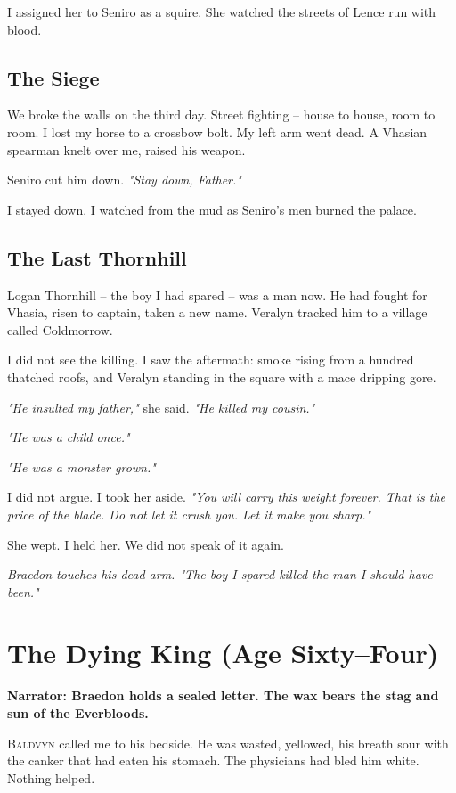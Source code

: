 \documentclass[11pt]{book}
\begin{document}
I assigned her to Seniro as a squire. She watched the streets of Lence run with blood.

\section*{The Siege}
We broke the walls on the third day. Street fighting -- house to house, room to room. I lost my horse to a crossbow bolt. My left arm went dead. A Vhasian spearman knelt over me, raised his weapon.

Seniro cut him down. \emph{"Stay down, Father."}

I stayed down. I watched from the mud as Seniro's men burned the palace.

\section*{The Last Thornhill}
Logan Thornhill -- the boy I had spared -- was a man now. He had fought for Vhasia, risen to captain, taken a new name. Veralyn tracked him to a village called Coldmorrow.

I did not see the killing. I saw the aftermath: smoke rising from a hundred thatched roofs, and Veralyn standing in the square with a mace dripping gore.

\emph{"He insulted my father,"} she said. \emph{"He killed my cousin."}

\emph{"He was a child once."}

\emph{"He was a monster grown."}

I did not argue. I took her aside. \emph{"You will carry this weight forever. That is the price of the blade. Do not let it crush you. Let it make you sharp."}

She wept. I held her. We did not speak of it again.

\vspace{1em}
\noindent\textit{Braedon touches his dead arm. "The boy I spared killed the man I should have been."}

\clearpage

\chapter{The Dying King (Age Sixty--Four)}

\textbf{Narrator: Braedon holds a sealed letter. The wax bears the stag and sun of the Everbloods.}

\lettrine{B}{aldvyn} called me to his bedside. He was wasted, yellowed, his breath sour with the canker that had eaten his stomach. The physicians had bled him white. Nothing helped.
\end{document}
